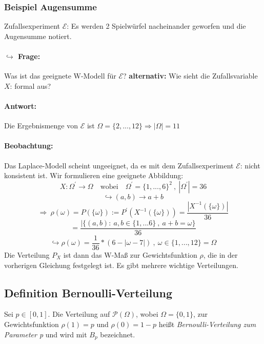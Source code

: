 \documentclass[12pt,a4paper]{article}
\begin{document}
	\subsubsection{Beispiel Augensumme}
	Zufallsexperiment $\mathcal{E}$: Es werden 2 Spielwürfel nacheinander geworfen und die Augensumme notiert.
	\paragraph{$\hookrightarrow$ Frage: }
	Was ist das geeignete W-Modell für $\mathcal{E}$? \newline
	\textbf{alternativ:} Wie sieht die Zufallsvariable $X$:  
	formal aus?
	\paragraph{Antwort: }
	Die Ergebnismenge von $\mathcal{E}$ ist $\Omega=\{2,...,12\} \Rightarrow |\Omega|=11$
	\paragraph{Beobachtung: }
	Das Laplace-Modell scheint ungeeignet, da es mit dem Zufallsexperiment $\mathcal{E}$:
	 nicht konsistent ist.
	\newline
	Wir formulieren eine geeignete Abbildung:
	$$X:\Omega^{'}\rightarrow\Omega \quad \text{wobei} \quad \Omega^{'}=\{1,...,6\}^2\: ,\: |\Omega^{'}|=36$$
	$$\hookrightarrow (a,b)\rightarrow a+b$$
	$$\Rightarrow\:\rho(\omega)=P(\{\omega\}):=P^{'}(X^{-1}(\{\omega\}))=\frac{|X^{-1}(\{\omega\})|}{36}$$
	$$=\frac{|\{(a,b):\: a,b\in\{1,...6\}\: , \: a+b=\omega\}}{36}$$
	$$\hookrightarrow\rho(\omega)=\frac{1}{36}*(6-|\omega -7|)\: , \:\omega\in\{1,...,12\}=\Omega$$
	Die Verteilung $P_X$ ist dann das W-Maß zur Gewichtsfunktion $\rho$, die in der vorherigen Gleichung 
	festgelegt ist. Es gibt mehrere wichtige Verteilungen.
	\subsection{Definition Bernoulli-Verteilung}
	Sei $p\in[0,1]$. Die Verteilung auf $\mathcal{P}(\Omega)$, wobei $\Omega=\{0,1\}$, zur Gewichtsfunktion
	$\rho(1)=p$ und $\rho(0)=1-p$ heißt \textit{Bernoulli-Verteilung zum Parameter p} und wird mit 
	\textit{$B_p$} bezeichnet.
\end{document}
